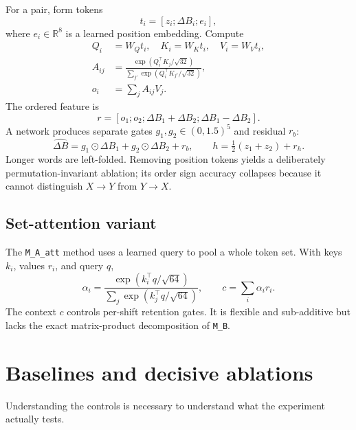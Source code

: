 \documentclass[11pt,a4paper]{article}
\newcommand{\R}{\mathbb{R}}
\newcommand{\od}{\odot}
\newcommand{\dB}{\Delta B}
\newcommand{\dBh}{\widehat{\Delta B}}
\newcommand{\MB}{\texttt{M\_B}}
\begin{document}
For a pair, form tokens
\[
t_i=[z_i;\dB_i;e_i],
\]
where $e_i\in\R^8$ is a learned position embedding.  Compute
\begin{align}
Q_i&=W_Qt_i,\quad K_i=W_Kt_i,\quad V_i=W_Vt_i,\\
A_{ij}&=\frac{\exp(Q_i^\top K_j/\sqrt{32})}
{\sum_{j'}\exp(Q_i^\top K_{j'}/\sqrt{32})},\\
o_i&=\sum_jA_{ij}V_j.
\end{align}
The ordered feature is
\[
r=[o_1;o_2;\dB_1+\dB_2;\dB_1-\dB_2].
\]
A network produces separate gates $g_1,g_2\in(0,1.5)^5$ and residual $r_b$:
\begin{equation}
\dBh=g_1\od\dB_1+g_2\od\dB_2+r_b,
\qquad
h=\tfrac12(z_1+z_2)+r_h.
\end{equation}
Longer words are left-folded.  Removing position tokens yields a deliberately
permutation-invariant ablation; its order sign accuracy collapses because it
cannot distinguish $X\to Y$ from $Y\to X$.

\subsection{Set-attention variant}

The \texttt{M\_A\_att} method uses a learned query to pool a whole token set.
With keys $k_i$, values $r_i$, and query $q$,
\[
\alpha_i=\frac{\exp(k_i^\top q/\sqrt{64})}
{\sum_j\exp(k_j^\top q/\sqrt{64})},
\qquad c=\sum_i\alpha_i r_i.
\]
The context $c$ controls per-shift retention gates.  It is flexible and
sub-additive but lacks the exact matrix-product decomposition of \MB{}.

\section{Baselines and decisive ablations}

Understanding the controls is necessary to understand what the experiment
actually tests.
\end{document}
